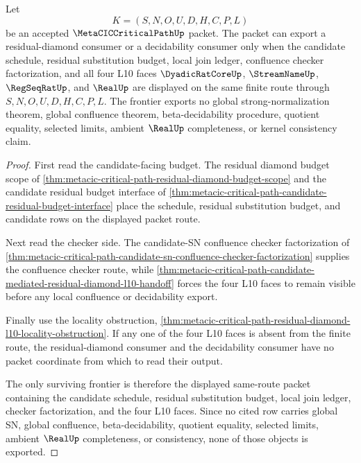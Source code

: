 \begin{theorem}
\label{thm:metacic-critical-path-residual-budget-frontier}
Let
$$
K=(S,N,O,U,D,H,C,P,L)
$$
be an accepted $\MetaCICCriticalPathUp$ packet. The packet can export a residual-diamond consumer or a decidability consumer only when the candidate schedule, residual substitution budget, local join ledger, confluence checker factorization, and all four L10 faces $\DyadicRatCoreUp$, $\StreamNameUp$, $\RegSeqRatUp$, and $\RealUp$ are displayed on the same finite route through $S,N,O,U,D,H,C,P,L$. The frontier exports no global strong-normalization theorem, global confluence theorem, beta-decidability procedure, quotient equality, selected limits, ambient $\RealUp$ completeness, or kernel consistency claim.
\end{theorem}
\begin{proof}
First read the candidate-facing budget. The residual diamond budget scope of \autoref{thm:metacic-critical-path-residual-diamond-budget-scope} and the candidate residual budget interface of \autoref{thm:metacic-critical-path-candidate-residual-budget-interface} place the schedule, residual substitution budget, and candidate rows on the displayed packet route.

Next read the checker side. The candidate-SN confluence checker factorization of \autoref{thm:metacic-critical-path-candidate-sn-confluence-checker-factorization} supplies the confluence checker route, while \autoref{thm:metacic-critical-path-candidate-mediated-residual-diamond-l10-handoff} forces the four L10 faces to remain visible before any local confluence or decidability export.

Finally use the locality obstruction, \autoref{thm:metacic-critical-path-residual-diamond-l10-locality-obstruction}. If any one of the four L10 faces is absent from the finite route, the residual-diamond consumer and the decidability consumer have no packet coordinate from which to read their output.

The only surviving frontier is therefore the displayed same-route packet containing the candidate schedule, residual substitution budget, local join ledger, checker factorization, and the four L10 faces. Since no cited row carries global SN, global confluence, beta-decidability, quotient equality, selected limits, ambient $\RealUp$ completeness, or consistency, none of those objects is exported.
\end{proof}

